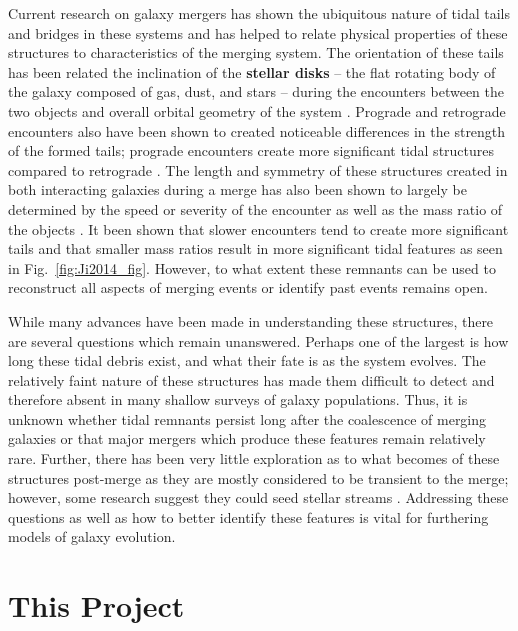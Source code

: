 \documentclass[fleqn,usenatbib]{mnras}
\begin{document}
Current research on galaxy mergers has shown the ubiquitous nature of tidal tails and bridges in these systems and has helped to relate physical properties of these structures to characteristics of the merging system. The orientation of these tails has been related the inclination of the \textbf{stellar disks} -- the flat rotating body of the galaxy composed of gas, dust, and stars -- during the encounters between the two objects and overall orbital geometry of the system \cite{Mihos_2004}. Prograde and retrograde encounters also have been shown to created noticeable differences in the strength of the formed tails; prograde encounters create more significant tidal structures compared to retrograde \cite{Privon_Barnes_Evans_Hibbard_Yun_Mazzarella_Armus_Surace_2013}. The length and symmetry of these structures created in both interacting galaxies during a merge has also been shown to largely be determined by the speed or severity of the encounter as well as the mass ratio of the objects \cite{Ji_Peirani_Yi_2014,Toomre_Toomre_1972}. It been shown that slower encounters tend to create more significant tails and that smaller mass ratios result in more significant tidal features as seen in Fig.~\ref{fig:Ji2014_fig}. However, to what extent these remnants can be used to reconstruct all aspects of merging events or identify past events remains open.

While many advances have been made in understanding these structures, there are several questions which remain unanswered. Perhaps one of the largest is how long these tidal debris exist, and what their fate is as the system evolves. The relatively faint nature of these structures has made them difficult to detect and therefore absent in many shallow surveys of galaxy populations. Thus, it is unknown whether tidal remnants persist long after the coalescence of merging galaxies or that major mergers which produce these features remain relatively rare. Further, there has been very little exploration as to what becomes of these structures post-merge as they are mostly considered to be transient to the merge; however, some research suggest they could seed stellar streams \cite{Wang_Hammer_Athanassoula_Puech_Yang_Flores_2012}. Addressing these questions as well as how to better identify these features is vital for furthering models of galaxy evolution.

\section{This Project}
\end{document}
